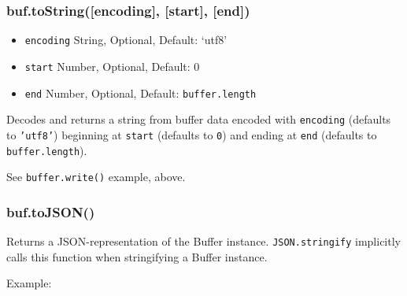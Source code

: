 \begin{Shaded}
\begin{Highlighting}[]
 \NormalTok{(}\NormalTok{);}
\NormalTok{(}\NormalTok{, }\NormalTok{);}
 \NormalTok{+ }\NormalTok{(}\NormalTok{, }
\end{Highlighting}
\end{Shaded}

\subsubsection{buf.toString({[}encoding{]}, {[}start{]},
{[}end{]})}\label{buf.tostringencoding-start-end}

\begin{itemize}
\itemsep1pt\parskip0pt
\item
  \texttt{encoding} String, Optional, Default: `utf8'
\item
  \texttt{start} Number, Optional, Default: 0
\item
  \texttt{end} Number, Optional, Default: \texttt{buffer.length}
\end{itemize}

Decodes and returns a string from buffer data encoded with
\texttt{encoding} (defaults to \texttt{'utf8'}) beginning at
\texttt{start} (defaults to \texttt{0}) and ending at \texttt{end}
(defaults to \texttt{buffer.length}).

See \texttt{buffer.write()} example, above.

\subsubsection{buf.toJSON()}\label{buf.tojson}

Returns a JSON-representation of the Buffer instance.
\texttt{JSON.stringify} implicitly calls this function when stringifying
a Buffer instance.

Example:

